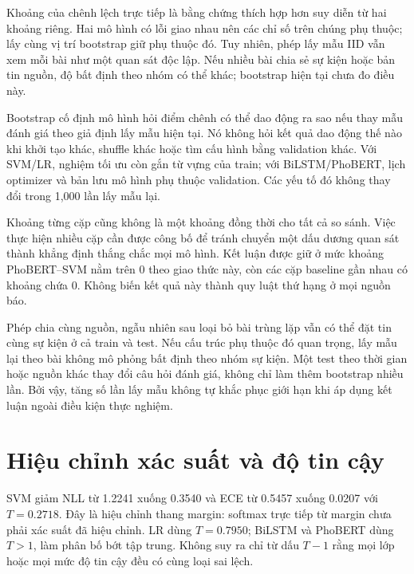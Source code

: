 Khoảng của chênh lệch trực tiếp là bằng chứng thích hợp hơn suy diễn từ hai khoảng riêng. Hai mô hình có lỗi giao nhau nên các chỉ số trên chúng phụ thuộc; lấy cùng vị trí bootstrap giữ phụ thuộc đó. Tuy nhiên, phép lấy mẫu IID vẫn xem mỗi bài như một quan sát độc lập. Nếu nhiều bài chia sẻ sự kiện hoặc bản tin nguồn, độ bất định theo nhóm có thể khác; bootstrap hiện tại chưa đo điều này.



Bootstrap cố định mô hình hỏi điểm chênh có thể dao động ra sao nếu thay mẫu đánh giá theo giả định lấy mẫu hiện tại. Nó không hỏi kết quả dao động thế nào khi khởi tạo khác, shuffle khác hoặc tìm cấu hình bằng validation khác. Với SVM/LR, nghiệm tối ưu còn gắn từ vựng của train; với BiLSTM/PhoBERT, lịch optimizer và bản lưu mô hình phụ thuộc validation. Các yếu tố đó không thay đổi trong 1,000 lần lấy mẫu lại.

Khoảng từng cặp cũng không là một khoảng đồng thời cho tất cả so sánh. Việc thực hiện nhiều cặp cần được công bố để tránh chuyển một dấu dương quan sát thành khẳng định thắng chắc mọi mô hình. Kết luận được giữ ở mức khoảng PhoBERT--SVM nằm trên 0 theo giao thức này, còn các cặp baseline gần nhau có khoảng chứa 0. Không biến kết quả này thành quy luật thứ hạng ở mọi nguồn báo.

Phép chia cùng nguồn, ngẫu nhiên sau loại bỏ bài trùng lặp vẫn có thể đặt tin cùng sự kiện ở cả train và test. Nếu cấu trúc phụ thuộc đó quan trọng, lấy mẫu lại theo bài không mô phỏng bất định theo nhóm sự kiện. Một test theo thời gian hoặc nguồn khác thay đổi câu hỏi đánh giá, không chỉ làm thêm bootstrap nhiều lần. Bởi vậy, tăng số lần lấy mẫu không tự khắc phục giới hạn khi áp dụng kết luận ngoài điều kiện thực nghiệm.

\FloatBarrier
\section{Hiệu chỉnh xác suất và độ tin cậy}

SVM giảm NLL từ 1.2241 xuống 0.3540 và ECE từ 0.5457 xuống 0.0207 với $T=0.2718$. Đây là hiệu chỉnh thang margin: softmax trực tiếp từ margin chưa phải xác suất đã hiệu chỉnh. LR dùng $T=0.7950$; BiLSTM và PhoBERT dùng $T>1$, làm phân bố bớt tập trung. Không suy ra chỉ từ dấu $T-1$ rằng mọi lớp hoặc mọi mức độ tin cậy đều có cùng loại sai lệch.

